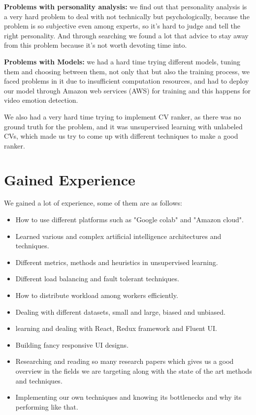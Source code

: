 \textbf{Problems with personality analysis: }we find out that personality analysis is a very hard problem to deal with not technically but psychologically, because the problem is so subjective even among experts, so it’s hard to judge and tell the right personality. And through searching we found a lot that advice to stay away from this problem because it’s not worth devoting time into. \newline

\textbf{Problems with Models: }we had a hard time trying different models, tuning them and choosing between them, not only that but also the training process, we faced problems in it due to insufficient computation resources, and had to deploy our model through Amazon web services (AWS) for training and this happens for video emotion detection. 

We also had a very hard time trying to implement CV ranker, as there was no ground truth for the problem, and it was unsupervised learning with unlabeled CVs, which made us try to come up with different techniques to make a good ranker.\newline


\section{Gained Experience}

We gained a lot of experience, some of them are as follows:
\begin{itemize}
    \item How to use different  platforms such as "Google colab" and "Amazon cloud".
    \item Learned various and complex artificial intelligence architectures and techniques.
    \item Different metrics, methods and heuristics in unsupervised learning.
    \item Different load balancing and fault tolerant techniques.
    \item How to distribute workload among workers efficiently.
    \item Dealing with different datasets, small and large, biased and unbiased.
    \item learning and dealing with React, Redux framework and Fluent UI.
    \item Building fancy responsive UI designs.
    \item Researching and reading so many research papers which gives us a good overview in the fields we are targeting along with the state of the art methods and techniques.
    \item Implementing our own techniques and knowing its bottlenecks and why its performing like that.
\end{itemize}


